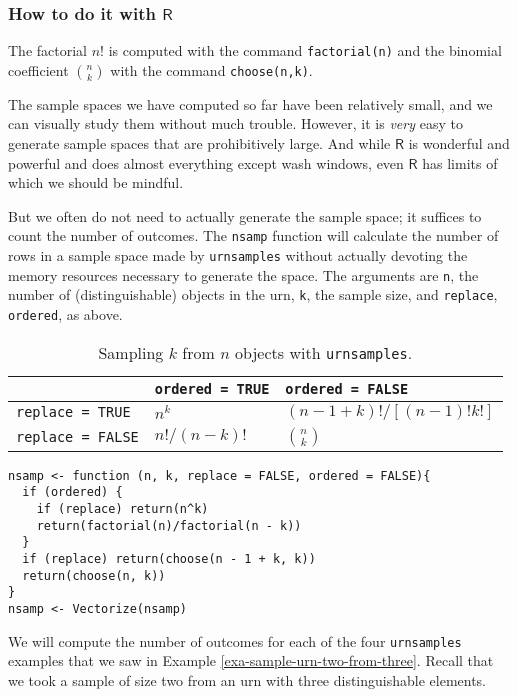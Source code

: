 \subsubsection{How to do it with \(\mathsf{R}\)}
\label{sec-4-5-2-1}

The factorial \(n!\) is computed with the command \texttt{factorial(n)} and
the binomial coefficient \({n \choose k}\) with the command
\texttt{choose(n,k)}.

The sample spaces we have computed so far have been relatively small,
and we can visually study them without much trouble. However, it is
\emph{very} easy to generate sample spaces that are prohibitively
large. And while \(\mathsf{R}\) is wonderful and powerful and does
almost everything except wash windows, even \(\mathsf{R}\) has limits
of which we should be mindful.

But we often do not need to actually generate the sample space; it
suffices to count the number of outcomes. The \texttt{nsamp} function will
calculate the number of rows in a sample space made by \texttt{urnsamples}
without actually devoting the memory resources necessary to generate
the space. The arguments are \texttt{n}, the number of (distinguishable)
objects in the urn, \texttt{k}, the sample size, and \texttt{replace}, \texttt{ordered}, as
above.

\begin{table}[htb]
\caption[Sampling \(k\) from \(n\) objects with \texttt{urnsamples}]{\label{tab-Sampling-k-from-n}Sampling \(k\) from \(n\) objects with \texttt{urnsamples}.}
\centering
\begin{tabular}{lll}
 & \texttt{ordered = TRUE} & \texttt{ordered = FALSE}\\
\hline
\texttt{replace = TRUE} & \(n^{k}\) & \((n-1+k)! / [(n-1)!k!]\)\\
\texttt{replace = FALSE} & \( n! / (n-k)! \) & \( {n \choose k} \)\\
\hline
\end{tabular}
\end{table}

\begin{Verbatim}
nsamp <- function (n, k, replace = FALSE, ordered = FALSE){
  if (ordered) {
    if (replace) return(n^k)
    return(factorial(n)/factorial(n - k))
  }
  if (replace) return(choose(n - 1 + k, k))
  return(choose(n, k))
}
nsamp <- Vectorize(nsamp)
\end{Verbatim}


We will compute the number of outcomes for each of the four
\texttt{urnsamples} examples that we saw in Example
\ref{exa-sample-urn-two-from-three}. Recall that we took a sample of size two from an
urn with three distinguishable elements.


